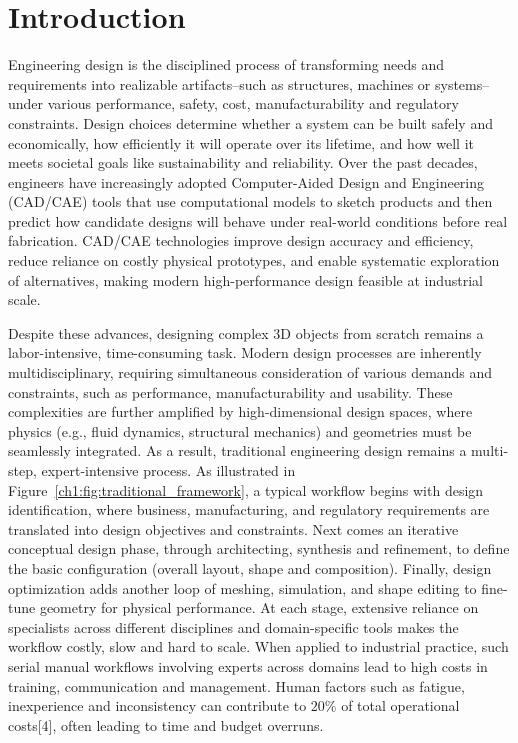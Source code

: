 \chapter{Introduction}

Engineering design is the disciplined process of transforming needs and requirements into realizable artifacts--such as structures, machines or systems--under various performance, safety, cost, manufacturability and regulatory constraints. Design choices determine whether a system can be built safely and economically, how efficiently it will operate over its lifetime, and how well it meets societal goals like sustainability and reliability. Over the past decades, engineers have increasingly adopted Computer-Aided Design and Engineering (CAD/CAE) tools that use computational models to sketch products and then predict how candidate designs will behave under real-world conditions before real fabrication. CAD/CAE technologies improve design accuracy and efficiency, reduce reliance on costly physical prototypes, and enable systematic exploration of alternatives, making modern high-performance design feasible at industrial scale.

Despite these advances, designing complex 3D objects from scratch remains a labor-intensive, time-consuming task. Modern design processes are inherently multidisciplinary, requiring simultaneous consideration of various demands and constraints, such as performance, manufacturability and usability. These complexities are further amplified by high-dimensional design spaces, where physics (e.g., fluid dynamics, structural mechanics) and geometries must be seamlessly integrated. As a result, traditional engineering design remains a multi-step, expert-intensive process. As illustrated in Figure~\ref{ch1:fig:traditional_framework}, a typical workflow begins with design identification, where business, manufacturing, and regulatory requirements are translated into design objectives and constraints. Next comes an iterative conceptual design phase, through architecting, synthesis and refinement, to define the basic configuration (overall layout, shape and composition). Finally, design optimization adds another loop of meshing, simulation, and shape editing to fine-tune geometry for physical performance. At each stage, extensive reliance on specialists across different disciplines and domain-specific tools makes the workflow costly, slow and hard to scale. When applied to industrial practice, such serial manual workflows involving experts across domains lead to high costs in training, communication and management. Human factors such as fatigue, inexperience and inconsistency can contribute to $20\%$ of total operational costs[4], often leading to time and budget overruns.


